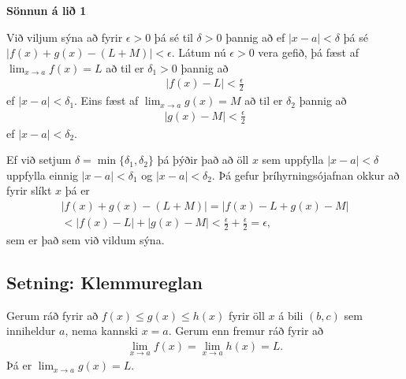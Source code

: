 \documentclass[b5paper,11pt,icelandic]{sphinxmanual}
\begin{document}
\textbf{Sönnun á lið 1}

Við viljum sýna að fyrir \(\epsilon>0\) þá sé til \(\delta>0\)
þannig að ef \(|x-a|<\delta\) þá sé \(|f(x)+g(x) - (L+M)|<\epsilon\).
Látum nú \(\epsilon>0\) vera gefið, þá fæst af
\(\lim_{x\to a} f(x) = L\) að til er \(\delta_1>0\) þannig að
\begin{equation*}
\begin{split}|f(x)-L| < \frac \epsilon 2\end{split}
\end{equation*}
ef \(|x-a|<\delta_1\). Eins fæst af \(\lim_{x \to a} g(x)=M\)
að til er \(\delta_2\) þannig að
\begin{equation*}
\begin{split}|g(x)-M| < \frac \epsilon 2\end{split}
\end{equation*}
ef \(|x-a|<\delta_2\).

Ef við setjum \(\delta = \min\{\delta_1,\delta_2\}\) þá þýðir það að
öll \(x\) sem uppfylla \(|x-a|<\delta\) uppfylla einnig
\(|x-a|<\delta_1\) og \(|x-a|<\delta_2\). Þá gefur þríhyrningsójafnan
okkur að fyrir slíkt \(x\) þá er
\begin{equation*}
\begin{split}|f(x)+g(x) - (L+M)| = |f(x)-L + g(x)-M| \\
< |f(x)-L| + |g(x)-M| < \frac \epsilon 2 + \frac \epsilon 2 = \epsilon,\end{split}
\end{equation*}
sem er það sem við vildum sýna.


\subsection{Setning: Klemmureglan}
\label{kafli02:setning-klemmureglan}\label{kafli02:index-3}
Gerum ráð fyrir að \(f(x)\leq
g(x)\leq h(x)\) fyrir öll \(x\) á bili \((b, c)\) sem inniheldur
\(a\), nema kannski \(x=a\). Gerum enn fremur ráð fyrir að
\begin{equation*}
\begin{split}\lim_{x\rightarrow a}f(x)=\lim_{x\rightarrow a}h(x)=L.\end{split}
\end{equation*}
Þá er \(\lim_{x\rightarrow a}g(x)=L\).

\end{document}

